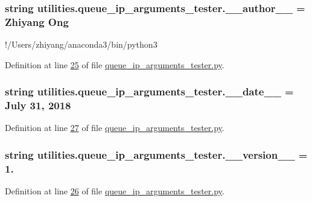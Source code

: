 \subsubsection[{\+\_\+\+\_\+author\+\_\+\+\_\+}]{\setlength{\rightskip}{0pt plus 5cm}string utilities.\+queue\+\_\+ip\+\_\+arguments\+\_\+tester.\+\_\+\+\_\+author\+\_\+\+\_\+ = \textquotesingle{}Zhiyang Ong\textquotesingle{}}\label{namespaceutilities_1_1queue__ip__arguments__tester_a4613e6fdf0e66646ab9e6b2431f60697}


!/\+Users/zhiyang/anaconda3/bin/python3 



Definition at line \hyperlink{queue__ip__arguments__tester_8py_source_l00025}{25} of file \hyperlink{queue__ip__arguments__tester_8py_source}{queue\+\_\+ip\+\_\+arguments\+\_\+tester.\+py}.

\hypertarget{namespaceutilities_1_1queue__ip__arguments__tester_abb3d4e36e816d047434e26922c0e28fe}{}
\subsubsection[{\+\_\+\+\_\+date\+\_\+\+\_\+}]{\setlength{\rightskip}{0pt plus 5cm}string utilities.\+queue\+\_\+ip\+\_\+arguments\+\_\+tester.\+\_\+\+\_\+date\+\_\+\+\_\+ = \textquotesingle{}July 31, 2018\textquotesingle{}}\label{namespaceutilities_1_1queue__ip__arguments__tester_abb3d4e36e816d047434e26922c0e28fe}


Definition at line \hyperlink{queue__ip__arguments__tester_8py_source_l00027}{27} of file \hyperlink{queue__ip__arguments__tester_8py_source}{queue\+\_\+ip\+\_\+arguments\+\_\+tester.\+py}.

\hypertarget{namespaceutilities_1_1queue__ip__arguments__tester_a37d1fc5c2ed863dec0b8ce969bc4ac4c}{}
\subsubsection[{\+\_\+\+\_\+version\+\_\+\+\_\+}]{\setlength{\rightskip}{0pt plus 5cm}string utilities.\+queue\+\_\+ip\+\_\+arguments\+\_\+tester.\+\_\+\+\_\+version\+\_\+\+\_\+ = \textquotesingle{}1.\textquotesingle{}}\label{namespaceutilities_1_1queue__ip__arguments__tester_a37d1fc5c2ed863dec0b8ce969bc4ac4c}


Definition at line \hyperlink{queue__ip__arguments__tester_8py_source_l00026}{26} of file \hyperlink{queue__ip__arguments__tester_8py_source}{queue\+\_\+ip\+\_\+arguments\+\_\+tester.\+py}.


